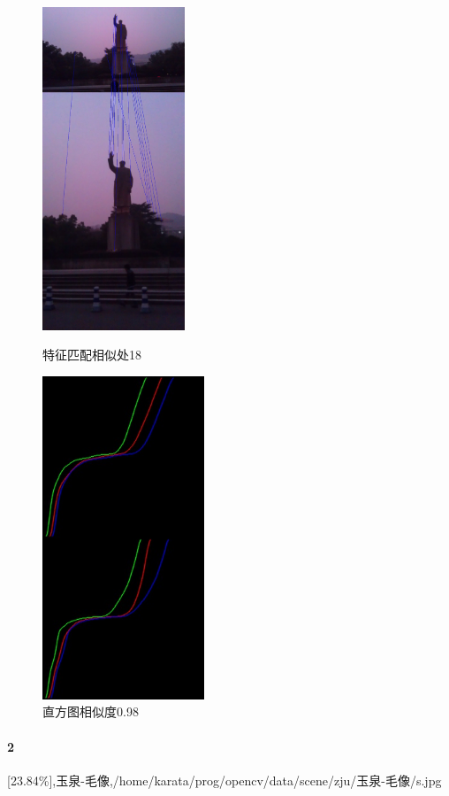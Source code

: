 \begin{figure}[htb]
\begin{minipage}[t]{0.5\linewidth}
\centering
\includegraphics[height=3.8in]{玉泉毛像.jpg.d/im1sift.jpg}
\caption{特征匹配相似处18}
\label{fig:side:a}
\end{minipage}%
\begin{minipage}[t]{0.5\linewidth}
\centering
\includegraphics[height=3.8in]{玉泉毛像.jpg.d/im1hist2.jpg}
\caption{直方图相似度0.98}
\label{fig:side:a}
\end{minipage}%
\end{figure}

\clearpage
\paragraph{2}
[23.84\%],玉泉-毛像,/home/karata/prog/opencv/data/scene/zju/玉泉-毛像/s.jpg

